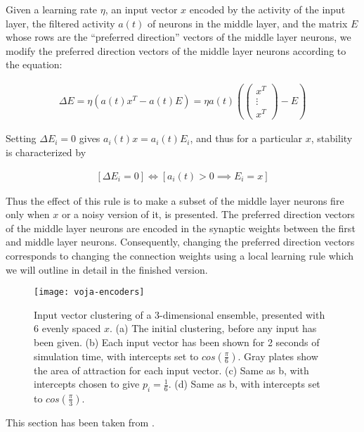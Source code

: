 Given a learning rate $\eta$, an input vector $x$ encoded by the activity of the input layer, the filtered activity $a(t)$ of  neurons in the middle layer, and the matrix $E$ whose rows are the ``preferred direction'' vectors of the middle layer neurons, we modify the preferred direction vectors of the middle layer neurons according to the equation:

\begin{align} \label{voja}
    \Delta{E} = \eta(a(t) x^T - a(t)E) = \eta a(t) (\begin{pmatrix}x^T \\ \vdots \\ x^T\end{pmatrix} - E)
\end{align}

Setting $\Delta{E_i} = 0$ gives $a_i(t)x = a_i(t)E_i$, and thus for a particular $x$, stability is characterized by

\begin{align} \label{stability}
    [\Delta{E_i} = 0]  \iff  [a_i(t) > 0  \implies  E_i = x]
\end{align}

Thus the effect of this rule is to make a subset of the middle layer neurons fire only when $x$ or a noisy version of it, is presented. The preferred direction vectors of the middle layer neurons are encoded in the synaptic weights between the first and middle layer neurons. Consequently, changing the preferred direction vectors corresponds to changing the connection weights using a local learning rule which we will outline in detail in the finished version.

\begin{figure}
    \centering
    \texttt{[image: voja-encoders]}
    \caption{Input vector clustering of a 3-dimensional ensemble, presented with 6 evenly spaced $x$. (a) The initial clustering, before any input has been given. (b) Each input vector has been shown for 2 seconds of simulation time, with intercepts set to $cos(\frac{\pi}{6})$. Gray plates show the area of attraction for each input vector. (c) Same as b, with intercepts chosen to give $p_i = \frac{1}{6}$. (d) Same as b, with intercepts set to $cos(\frac{\pi}{3})$. \label{e3d}}
\end{figure}

This section has been taken from \citep{knight2016}.

